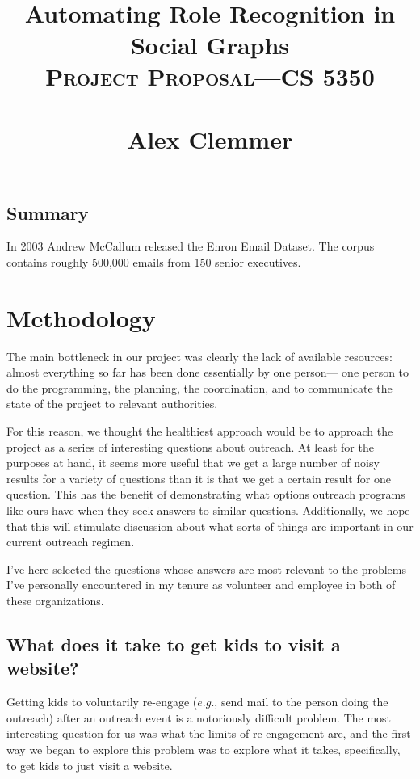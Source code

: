 \documentclass[11pt,a4paper]{article}
\title{
		\textsc{\LARGE }\\[1.5cm]
		\HRule \\[0.4cm]
		{ \huge \bfseries Automating Role Recognition in Social Graphs }\\		\textsc{Project Proposal---CS 5350 }\\
		\HRule \\[1.5cm]
		Alex Clemmer \\
}
\begin{document}
\maketitle

\pagebreak

\subsection*{Summary}

In 2003 Andrew McCallum released the Enron Email Dataset. The corpus contains roughly 500,000 emails from 150 senior executives. 

\section{Methodology}

The main bottleneck in our project was clearly the lack of available resources: almost everything so far has been done essentially by one person--- one person to do the programming, the planning, the coordination, and to communicate the state of the project to relevant authorities.

For this reason, we thought the healthiest approach would be to approach the project as a series of interesting questions about outreach. At least for the purposes at hand, it seems more useful that we get a large number of noisy results for a variety of questions than it is that we get a certain result for one question. This has the benefit of demonstrating what options outreach programs like ours have when they seek answers to similar questions. Additionally, we hope that this will stimulate discussion about what sorts of things are important in our current outreach regimen.

I've here selected the questions whose answers are most relevant to the problems I've personally encountered in my tenure as volunteer and employee in both of these organizations.

\subsection{What does it take to get kids to visit a website?}

Getting kids to voluntarily re-engage ($\textit{e.g.}$, send mail to the person doing the outreach) after an outreach event is a notoriously difficult problem. The most interesting question for us was what the limits of re-engagement are, and the first way we began to explore this problem was to explore what it takes, specifically, to get kids to just visit a website.
\end{document}
